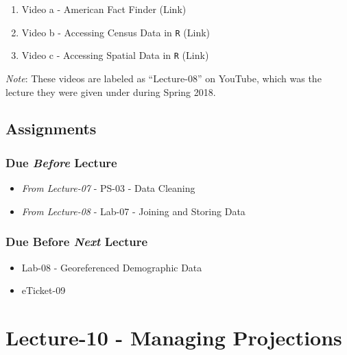 \documentclass[
]{book}
\providecommand{\tightlist}{%
  \setlength{\itemsep}{0pt}\setlength{\parskip}{0pt}}
\begin{document}
\begin{enumerate}
\def\labelenumi{\arabic{enumi}.}
\tightlist
\item
  Video a - American Fact Finder (Link)
\item
  Video b - Accessing Census Data in \texttt{R} (Link)
\item
  Video c - Accessing Spatial Data in \texttt{R} (Link)
\end{enumerate}

\emph{Note}: These videos are labeled as ``Lecture-08'' on YouTube, which was the lecture they were given under during Spring 2018.

\hypertarget{assignments-10}{%
\subsection*{Assignments}\label{assignments-10}}

\hypertarget{due-before-lecture-8}{%
\subsubsection*{\texorpdfstring{Due \emph{Before} Lecture}{Due Before Lecture}}\label{due-before-lecture-8}}

\begin{itemize}
\tightlist
\item
  \emph{From Lecture-07} - PS-03 - Data Cleaning
\item
  \emph{From Lecture-08} - Lab-07 - Joining and Storing Data
\end{itemize}

\hypertarget{due-before-next-lecture-7}{%
\subsubsection*{\texorpdfstring{Due Before \emph{Next} Lecture}{Due Before Next Lecture}}\label{due-before-next-lecture-7}}

\begin{itemize}
\tightlist
\item
  Lab-08 - Georeferenced Demographic Data
\item
  eTicket-09
\end{itemize}

\hypertarget{lecture-10---managing-projections}{%
\section*{Lecture-10 - Managing Projections}\label{lecture-10---managing-projections}}
\end{document}
